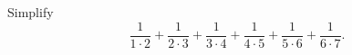 Simplify
\[
\dfrac{1}{1\cdot2}+\dfrac{1}{2\cdot3}+\dfrac{1}{3\cdot4}+\dfrac{1}{4\cdot5}+\dfrac{1}{5\cdot6}+\dfrac{1}{6\cdot7}.
\]
